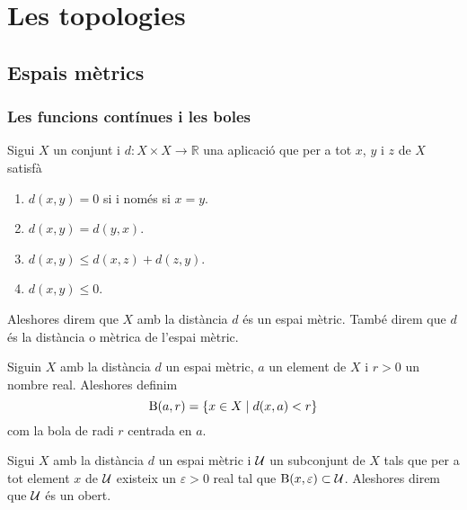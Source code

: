 \documentclass[../Apunts.tex]{subfiles}
\begin{document}
\chapter{Les topologies}
	\section{Espais mètrics}
	\subsection{Les funcions contínues i les boles}
	\begin{definition}
		\label{def:espai mètric}
		\label{def:distància}
		Sigui \(X\) un conjunt i \(d\colon X\times X\longrightarrow\mathbb{R}\) una aplicació que per a tot \(x\), \(y\) i \(z\) de \(X\) satisfà
		\begin{enumerate}
			\item \(d(x,y)=0\) si i només si \(x=y\).
			\item \(d(x,y)=d(y,x)\).
			\item \(d(x,y)\leq d(x,z)+d(z,y)\).
			\item \(d(x,y)\leq0\).
		\end{enumerate}
		Aleshores direm que \(X\) amb la distància \(d\) és un espai mètric. També direm que \(d\) és la distància o mètrica de l'espai mètric.
	\end{definition}
	\begin{definition}[Bola]
		\label{def:bola}
		Siguin \(X\) amb la distància \(d\) un espai mètric, \(a\) un element de \(X\) i \(r>0\) un nombre real. Aleshores definim
		\[\operatorname{B}(a,r)=\{x\in X\mid d(x,a)<r\}\]
		com la bola de radi \(r\) centrada en \(a\).
	\end{definition}
	\begin{definition}[Obert]
		\label{def:obert espai mètric}
		Sigui \(X\) amb la distància \(d\) un espai mètric i \(\mathcal{U}\) un subconjunt de \(X\) tals que per a tot element \(x\) de \(\mathcal{U}\) existeix un \(\varepsilon>0\) real tal que \(\operatorname{B}(x,\varepsilon)\subset\mathcal{U}\). Aleshores direm que \(\mathcal{U}\) és un obert.
	\end{definition}
\end{document}
